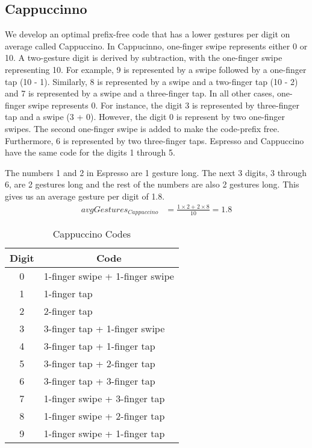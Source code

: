 \subsection{Cappuccinno}
We develop an optimal prefix-free code that has a lower gestures per digit on average called Cappuccino. In Cappucinno, one-finger swipe represents either 0 or 10. A two-gesture digit is derived by subtraction, with the one-finger swipe representing 10. For example, 9 is represented by a swipe followed by a one-finger tap (10 - 1). Similarly, 8 is represented by a swipe and a two-finger tap (10 - 2) and 7 is represented by a swipe and a three-finger tap. In all other cases, one-finger swipe represents 0. For instance, the digit 3 is represented by three-finger tap and a swipe (3 + 0). However, the digit 0 is represent by two one-finger swipes. The second one-finger swipe is added to make the code-prefix free. Furthermore, 6 is represented by two three-finger taps. Espresso and Cappuccino have the same code for the digits 1 through 5. 
\par
The numbers 1 and 2 in Espresso are 1 gesture long. The next 3 digits, 3 through 6, are 2 gestures long and the rest of the numbers are also 2 gestures long. This gives us an average gesture per digit of 1.8.
  \begin{align*}
    avgGestures_{Cappuccino} &= \frac{1\times2 + 2\times8}{10} = 1.8
  \end{align*}

\begin{table}[ht]
  \caption{Cappuccino Codes}
  \centering
  \begin{tabular}{cl}
  \hline
  \multicolumn{1}{c}{Digit} & \multicolumn{1}{c}{Code} \\
  \hline
  0 & 1-finger swipe + 1-finger swipe \\
  1 & 1-finger tap \\
  2 & 2-finger tap \\
  3 & 3-finger tap + 1-finger swipe \\
  4 & 3-finger tap + 1-finger tap \\
  5 & 3-finger tap + 2-finger tap \\
  6 & 3-finger tap + 3-finger tap \\
  7 & 1-finger swipe + 3-finger tap \\
  8 & 1-finger swipe + 2-finger tap \\
  9 & 1-finger swipe + 1-finger tap \\ [1ex]
  \hline
  \end{tabular}
  \label{table:nonlin}
\end{table}

